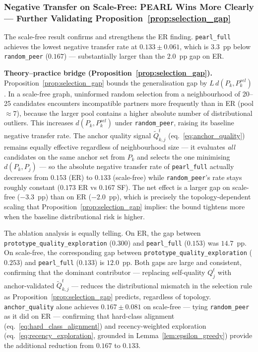 \documentclass[conference]{IEEEtran}
\begin{document}
\subsubsection{Negative Transfer on Scale-Free: PEARL Wins More Clearly — Further Validating Proposition~\ref{prop:selection_gap}}
\label{subsubsec:sf-neg-transfer}

The scale-free result confirms and strengthens the ER finding. \texttt{pearl\_full} achieves the lowest negative transfer rate at $0.133\pm0.061$, which is $3.3$~pp below \texttt{random\_peer} ($0.167$) --- substantially larger than the $2.0$~pp gap on ER.

\textbf{Theory--practice bridge (Proposition~\ref{prop:selection_gap}).}
Proposition~\ref{prop:selection_gap} bounds the generalisation gap by $L\,d(P_k, P^{sel}_k)$. In a scale-free graph, uninformed random selection from a neighbourhood of 20--25 candidates encounters incompatible partners more frequently than in ER (pool $\approx7$), because the larger pool contains a higher absolute number of distributional outliers. This increases $d(P_k, P^{sel}_k)$ under \texttt{random\_peer}, raising its baseline negative transfer rate. The anchor quality signal $\tilde{Q}^t_{k,j}$ (eq.~\eqref{eq:anchor_quality}) remains equally effective regardless of neighbourhood size --- it evaluates \emph{all} candidates on the same anchor set from $P_k$ and selects the one minimising $d(P_k, P_j)$ --- so the absolute negative transfer rate of \texttt{pearl\_full} actually decreases from $0.153$ (ER) to $0.133$ (scale-free) while \texttt{random\_peer}'s rate stays roughly constant ($0.173$ ER vs $0.167$ SF). The net effect is a larger gap on scale-free ($-3.3$~pp) than on ER ($-2.0$~pp), which is precisely the topology-dependent scaling that Proposition~\ref{prop:selection_gap} implies: the bound tightens more when the baseline distributional risk is higher.

The ablation analysis is equally telling. On ER, the gap between \texttt{prototype\_quality\_exploration} ($0.300$) and \texttt{pearl\_full} ($0.153$) was $14.7$~pp. On scale-free, the corresponding gap between \texttt{prototype\_quality\_exploration} ($0.253$) and \texttt{pearl\_full} ($0.133$) is $12.0$~pp. Both gaps are large and consistent, confirming that the dominant contributor --- replacing self-quality $Q_j^t$ with anchor-validated $\tilde{Q}^t_{k,j}$ --- reduces the distributional mismatch in the selection rule as Proposition~\ref{prop:selection_gap} predicts, regardless of topology. \texttt{anchor\_quality} alone achieves $0.167\pm0.081$ on scale-free --- tying \texttt{random\_peer} as it did on ER --- confirming that hard-class alignment (eq.~\eqref{eq:hard_class_alignment}) and recency-weighted exploration (eq.~\eqref{eq:recency_exploration}, grounded in Lemma~\ref{lem:epsilon_greedy}) provide the additional reduction from $0.167$ to $0.133$.
\end{document}
